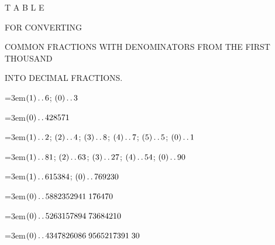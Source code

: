 \clearpage{}\thispagestyle{empty}
\renewcommand{\BookRunningTitle}{Conversion of Common Fractions into Decimals}
\begin{center}
\vspace*{1.0in}
{\LARGE T A B L E}\par\bigskip
{\large FOR CONVERTING}\par\bigskip
{\Large COMMON FRACTIONS WITH DENOMINATORS FROM THE FIRST THOUSAND}\par\bigskip
{\large INTO DECIMAL FRACTIONS.}
\end{center}

\clearpage{}%
\begingroup\raggedright{} 
\par\noindent\hangindent=3em\enspace $(1)\mathinner{.\,.}6$; $(0)\mathinner{.\,.}3$\par\smallskip

\par\noindent\hangindent=3em\enspace $(0)\mathinner{.\,.}428571$\par\smallskip

\par\noindent\hangindent=3em\enspace $(1)\mathinner{.\,.}2$; $(2)\mathinner{.\,.}4$; $(3)\mathinner{.\,.}8$; $(4)\mathinner{.\,.}7$; $(5)\mathinner{.\,.}5$; $(0)\mathinner{.\,.}1$\par\smallskip

\par\noindent\hangindent=3em\enspace $(1)\mathinner{.\,.}81$; $(2)\mathinner{.\,.}63$; $(3)\mathinner{.\,.}27$; $(4)\mathinner{.\,.}54$; $(0)\mathinner{.\,.}90$\par\smallskip

\par\noindent\hangindent=3em\enspace $(1)\mathinner{.\,.}615384$; $(0)\mathinner{.\,.}769230$\par\smallskip

\par\noindent\hangindent=3em\enspace $(0)\mathinner{.\,.}5882352941\;\allowbreak 176470$\par\smallskip

\par\noindent\hangindent=3em\enspace $(0)\mathinner{.\,.}5263157894\;\allowbreak 73684210$\par\smallskip

\par\noindent\hangindent=3em\enspace $(0)\mathinner{.\,.}4347826086\;\allowbreak 9565217391\;\allowbreak 30$\par\smallskip

